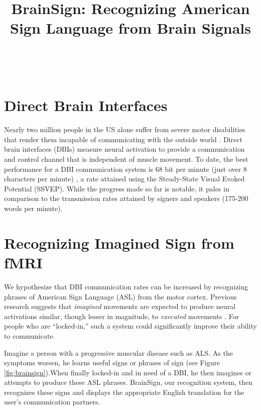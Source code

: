 \documentclass{proposal}
\title{BrainSign:  Recognizing American Sign Language from Brain Signals}
\begin{document}
\maketitle

\\

\section{Direct Brain Interfaces}

Nearly two million people in the US alone suffer from severe motor disabilities that render them incapable of communicating with the outside world \cite{ficke1992ddp, NABMRR1992, murray1997gmd, carter1997rmn}. Direct brain interfaces (DBIs) measure neural activation to provide a communication and control channel that is independent of muscle movement. To date, the best performance for a DBI communication system is 68 bit per minute (just over 8 characters per minute) \cite{gao2003bbe}, a rate attained using the Steady-State Visual Evoked Potential (SSVEP). While the progress made so far is notable, it pales in comparison to the transmission rates attained by signers and speakers (175-200 words per minute).

\section{Recognizing Imagined Sign from fMRI} %

We hypothesize that DBI communication rates can be increased by recognizing phrases of American Sign Language (ASL) from the motor cortex.  Previous research suggests that \textit{imagined} movements are expected to produce neural activations similar, though lesser in magnitude, to \textit{executed} movements \cite{beisteiner1995mrm,pfurtscheller1997mia, lang1996eam,lotze1999aac}. For people who are ``locked-in,'' such a system could significantly improve their ability to communicate.

Imagine a person with a progressive muscular disease such as ALS.  As the symptoms worsen, he learns useful signs or phrases of sign (see Figure \ref{fig:brainsign}).When finally locked-in and in need of a DBI, he then imagines or attempts to produce these ASL phrases. BrainSign, our recognition system, then recognizes these signs and displays the appropriate English translation for the user's communication partners.

\end{document}
